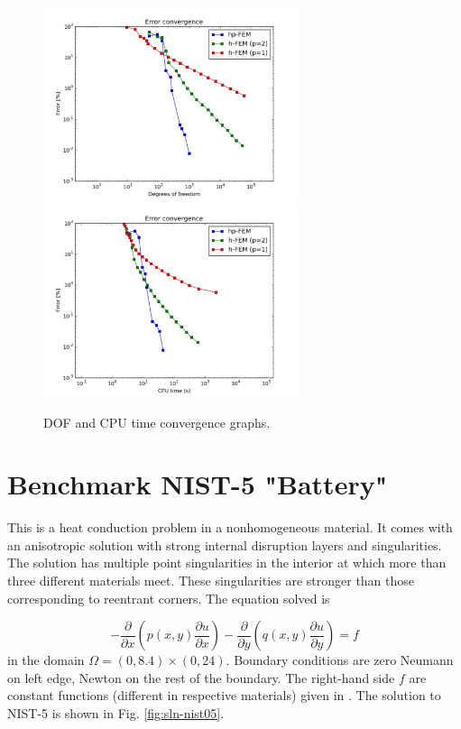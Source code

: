 \documentclass[12pt]{elsarticle}
\begin{document}
\begin{figure}[H]
\centering
\hspace{-50mm}
\includegraphics[width=7.5cm]{mafig27.pdf}\ \
\hspace{-10mm}
\includegraphics[width=7.5cm]{mafig28.pdf}
\hspace{-50mm}
\vspace{-2mm}
\caption{DOF and CPU time convergence graphs.}
\label{fig:nist-4-conv}
\end{figure}


\section{Benchmark NIST-5 "Battery"}
\label{sec:bench-5}

This is a heat conduction problem in a nonhomogeneous material.
It comes with an anisotropic solution with strong internal disruption
layers and singularities.
The solution has multiple point singularities in the interior at which
more than three different materials meet. These singularities are stronger than those
corresponding to reentrant corners. The equation solved is

\begin{equation} \label{heat-conduction}
-\frac{\partial }{\partial x}\left(p(x, y)\frac{\partial u}{\partial x}\right)
-\frac{\partial }{\partial y}\left(q(x, y)\frac{\partial u}{\partial y}\right) = f
\end{equation}
in the domain $\Omega = (0, 8.4) \times (0, 24)$. Boundary conditions are zero Neumann on left edge, Newton on the rest of the boundary.
The right-hand side $f$ are constant functions (different in respective materials) given in \cite{mitchell-1}.
The solution to NIST-5 is shown in Fig. \ref{fig:sln-nist05}.
\end{document}

